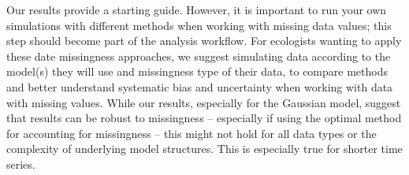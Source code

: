 \documentclass{article}
\begin{document}
\begin{linenumbers}

Our results provide a starting guide. However,  it is important to run your own simulations with different methods when working with missing data values; this step should become part of the analysis workflow. For ecologists wanting to apply these date missingness approaches, we suggest simulating data according to the model(s) they will use and missingness type of their data, to compare methods and better understand systematic bias and uncertainty when working with data with missing values. While our results, especially for the Gaussian model, suggest that results can be robust to missingness -- especially if using the optimal method for accounting for missingness -- this might not hold for all data types or the complexity of underlying model structures. This is especially true for shorter time series. 


\end{linenumbers}
\end{document}
